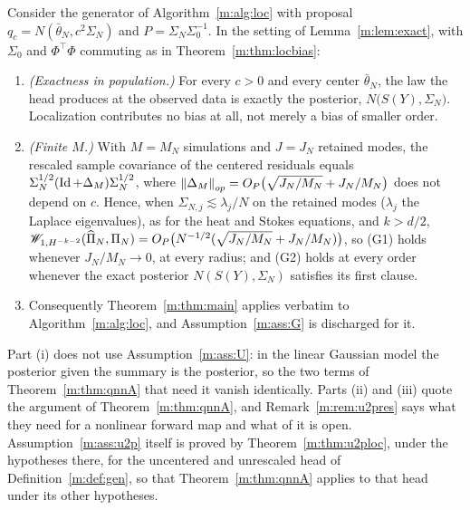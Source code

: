 \begin{corollary}\label{m:cor:locG}
Consider the generator of Algorithm~\ref{m:alg:loc} with proposal $q_c=N(\bar\theta_N,c^2\Sigma_N)$ and $P=\Sigma_N\Sigma_0^{-1}$. In the setting of Lemma~\ref{m:lem:exact}, with $\Sigma_0$ and $\Phi^\top\Phi$ commuting as in Theorem~\ref{m:thm:locbias}:
\begin{enumerate}[label=(\roman*),nosep]
\item \emph{(Exactness in population.)} For every $c>0$ and every center $\bar\theta_N$, the law the head produces at the observed data is exactly the posterior, $N\big(S(Y),\Sigma_N\big)$. Localization contributes no bias at all, not merely a bias of smaller order.
\item \emph{(Finite $M$.)} With $M=M_N$ simulations and $J=J_N$ retained modes, the rescaled sample covariance of the centered residuals equals $\Sigma_N^{1/2}(\operatorname{Id}+\Delta_M)\Sigma_N^{1/2}$, where $\left\|\Delta_M\right\|_{op}=O_P\big(\sqrt{J_N/M_N}+J_N/M_N\big)$ does not depend on $c$. Hence, when $\Sigma_{N,j}\lesssim\lambda_j/N$ on the retained modes ($\lambda_j$ the Laplace eigenvalues), as for the heat and Stokes equations, and $k>d/2$, $\mathscr{W}_{1,H^{-k-2}}(\widehat\Pi_N,\Pi_N)=O_P\big(N^{-1/2}(\sqrt{J_N/M_N}+J_N/M_N)\big)$, so (G1) holds whenever $J_N/M_N\to0$, at every radius; and (G2) holds at every order whenever the exact posterior $N(S(Y),\Sigma_N)$ satisfies its first clause.
\item Consequently Theorem~\ref{m:thm:main} applies verbatim to Algorithm~\ref{m:alg:loc}, and Assumption~\ref{m:ass:G} is discharged for it.
\end{enumerate}
Part (i) does not use Assumption~\ref{m:ass:U}: in the linear Gaussian model the posterior given the summary is the posterior, so the two terms of Theorem~\ref{m:thm:qnnA} that need it vanish identically. Parts (ii) and (iii) quote the argument of Theorem~\ref{m:thm:qnnA}, and Remark~\ref{m:rem:u2pres} says what they need for a nonlinear forward map and what of it is open. Assumption~\ref{m:ass:u2p} itself is proved by Theorem~\ref{m:thm:u2ploc}, under the hypotheses there, for the uncentered and unrescaled head of Definition~\ref{m:def:gen}, so that Theorem~\ref{m:thm:qnnA} applies to that head under its other hypotheses.
\end{corollary}

